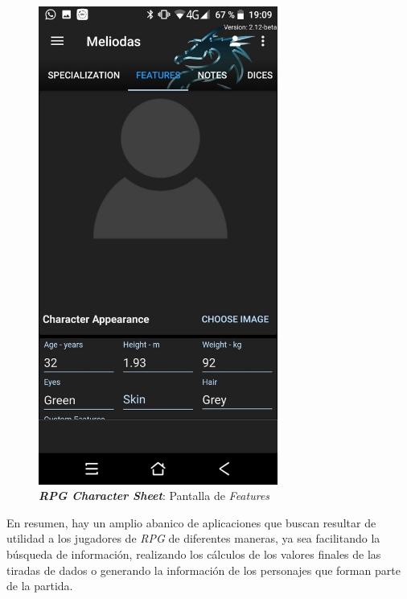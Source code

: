 \begin{figure}[H]
\begin{minipage}{0.3\textwidth}
        \includegraphics[width=0.7\textwidth]{Images/RPG_Character_Sheet_2.jpeg}
        \caption{\textit{\textbf{RPG Character Sheet}}: Pantalla de \textit{Features}}
        \label{RPGCharacterSheet2}
    \end{minipage}
\end{figure}

En resumen, hay un amplio abanico de aplicaciones que buscan resultar de utilidad a los 
jugadores de \textit{RPG} de diferentes maneras, ya sea facilitando la búsqueda de información, 
realizando los cálculos de los valores finales de las tiradas de dados o generando la información
de los personajes que forman parte de la partida.